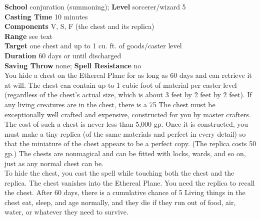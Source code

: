 \textbf{School} conjuration (summoning); \textbf{Level} sorcerer/wizard 5\\
\textbf{Casting Time} 10 minutes\\
\textbf{Components} V, S, F (the chest and its replica)\\
\textbf{Range} see text\\
\textbf{Target} one chest and up to 1 cu. ft. of goods/caster level\\
\textbf{Duration} 60 days or until discharged\\
\textbf{Saving Throw} none; \textbf{Spell Resistance} no\\
You hide a chest on the Ethereal Plane for as long as 60 days and can retrieve it at will. The chest can contain up to 1 cubic foot of material per caster level (regardless of the chest's actual size, which is about 3 feet by 2 feet by 2 feet). If any living creatures are in the chest, there is a 75%
The chest must be exceptionally well crafted and expensive, constructed for you by master crafters. The cost of such a chest is never less than 5,000 gp. Once it is constructed, you must make a tiny replica (of the same materials and perfect in every detail) so that the miniature of the chest appears to be a perfect copy. (The replica costs 50 gp.) The chests are nonmagical and can be fitted with locks, wards, and so on, just as any normal chest can be.\\
To hide the chest, you cast the spell while touching both the chest and the replica. The chest vanishes into the Ethereal Plane. You need the replica to recall the chest. After 60 days, there is a cumulative chance of 5%
Living things in the chest eat, sleep, and age normally, and they die if they run out of food, air, water, or whatever they need to survive.\\
